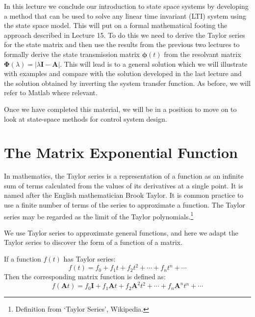 \def\FileDate{10/02/01}
\def\FileVersion{1.0}

In this lecture we conclude our introduction to state space systems by developing a method that can be used to solve any linear time invariant (LTI) system using the state space model. This will put on a formal mathematical footing the approach described in Lecture 15. To do this we need to derive the Taylor series for the state matrix and then use the results from the previous two lectures to formally derive the state transmission matrix $\mathbf{\phi}(t)$ from the resolvant matrix $\mathbf{\Phi}(\lambda) = |\lambda\mathbf{I}-\mathbf{A}|$. This will lead is to a general solution which we will illustrate with examples and compare with the solution developed in the last lecture and the solution obtained by inverting the system transfer function. As before, we will refer to Matlab where relevant.

Once we have completed this material, we will be in a position to move on to look at state-space methods for control system design.

\section*{The Matrix Exponential Function}

In mathematics, the Taylor series is a representation of a function as an infinite sum of terms calculated from the values of its derivatives at a single point. It is named after the English mathematician Brook Taylor. It is common practice to use a finite number of terms of the series to approximate a function. The Taylor series may be regarded as the limit of the Taylor polynomials.\footnote{Definition from `Taylor Series', Wikipedia.}

We use Taylor series to approximate general functions, and here we adapt the Taylor series to discover the form of a function of a matrix.
 
If a function $f(t)$ has Taylor series:
\[
f(t)=f_0 + f_1t + f_2t^2 + \cdots + f_nt^n + \cdots
\]
Then the corresponding matrix function is defined as:
\[
f(\mathbf{A}t)=f_0\mathbf{I} + f_1\mathbf{A}t + f_2\mathbf{A}^2t^2 + \cdots + f_n\mathbf{A}^nt^n + \cdots
\]
 

